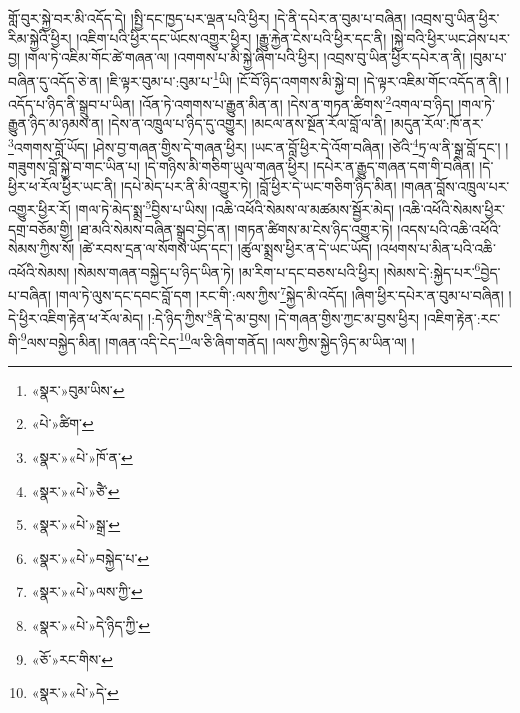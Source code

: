 གློ་བུར་སྐྱེ་བར་མི་འདོད་དེ། །སྤྱི་དང་ཁྱད་པར་ལྡན་པའི་ཕྱིར། །དེ་ནི་དཔེར་ན་བུམ་པ་བཞིན། །འབྲས་བུ་ཡིན་ཕྱིར་རིམ་སྐྱེའི་ཕྱིར། །འཇིག་པའི་ཕྱིར་དང་ཡོངས་འགྱུར་ཕྱིར། །རྒྱུ་རྐྱེན་ངེས་པའི་ཕྱིར་དང་ནི། །སྐྱེ་བའི་ཕྱིར་ཡང་ཤེས་པར་བྱ། །གལ་ཏེ་འཇིམ་གོང་ཚེ་གཞན་ལ། །འགགས་པ་མི་སྐྱེ་ཞིག་པའི་ཕྱིར། །འབྲས་བུ་ཡིན་ཕྱིར་དཔེར་ན་ནི། །བུམ་པ་བཞིན་དུ་འདོད་ཅེ་ན། །ཇི་ལྟར་བུམ་པ་:བུམ་པ་\footnote{«སྣར་»བུམ་ཡིས་}ཡི། །ངོ་བོ་ཉིད་འགགས་མི་སྐྱེ་བ། །དེ་ལྟར་འཇིམ་གོང་འདོད་ན་ནི། །འདོད་པ་ཉིད་ནི་སྒྲུབ་པ་ཡིན། །འོན་ཏེ་འགགས་པ་རྒྱུན་མིན་ན། །དེས་ན་གཏན་ཚིགས་\footnote{«པེ་»ཚིག་}འགལ་བ་ཉིད། །གལ་ཏེ་རྒྱུན་ཉིད་མ་ཉམས་ན། །དེས་ན་འཁྲུལ་པ་ཉིད་དུ་འགྱུར། །མངལ་ནས་སྔོན་རོལ་བློ་ལ་ནི། །མདུན་རོལ་:ཁོ་ནར་\footnote{«སྣར་»«པེ་»ཁོ་ན་}འགགས་བློ་ཡོད། །ཤེས་བྱ་གཞན་གྱིས་དེ་གཞན་ཕྱིར། །ཡང་ན་བློ་ཕྱིར་དེ་འོག་བཞིན། །ཙེའི་\footnote{«སྣར་»«པེ་»ཙཻ་}ཏྲ་ལ་ནི་སྒྲ་བློ་དང་། །གཟུགས་བློ་སྐྱེ་བ་གང་ཡིན་པ། །དེ་གཉིས་མི་གཅིག་ཡུལ་གཞན་ཕྱིར། །དཔེར་ན་རྒྱུད་གཞན་དག་གི་བཞིན། །དེ་ཕྱིར་ཕ་རོལ་ཕྱིར་ཡང་ནི། །དཔེ་མེད་པར་ནི་མི་འགྱུར་ཏེ། །བློ་ཕྱིར་དེ་ཡང་གཅིག་ཉིད་མིན། །གཞན་བློས་འཁྲུལ་པར་འགྱུར་ཕྱིར་རོ། །གལ་ཏེ་མེད་སྨྲ་\footnote{«སྣར་»«པེ་»སྒྲ་}བྱིས་པ་ཡིས། །འཆི་འཕོའི་སེམས་ལ་མཚམས་སྦྱོར་མེད། །འཆི་འཕོའི་སེམས་ཕྱིར་དགྲ་བཅོམ་གྱི། །ཐ་མའི་སེམས་བཞིན་སྒྲུབ་བྱེད་ན། །གཏན་ཚིགས་མ་ངེས་ཉིད་འགྱུར་ཏེ། །འདས་པའི་འཆི་འཕོའི་སེམས་ཀྱིས་སོ། །ཚེ་རབས་དྲན་ལ་སོགས་ཡོད་དང་། །ཚུལ་སྨྲས་ཕྱིར་ན་དེ་ཡང་ཡོད། །འཕགས་པ་མིན་པའི་འཆི་འཕོའི་སེམས། །སེམས་གཞན་བསྐྱེད་པ་ཉིད་ཡིན་ཏེ། །མ་རིག་པ་དང་བཅས་པའི་ཕྱིར། །སེམས་དེ་:སྐྱེད་པར་\footnote{«སྣར་»«པེ་»བསྐྱེད་པ་}བྱེད་པ་བཞིན། །གལ་ཏེ་ལུས་དང་དབང་བློ་དག །རང་གི་:ལས་ཀྱིས་\footnote{«སྣར་»«པེ་»ལས་ཀྱི་}སྐྱེད་མི་འདོད། །ཞིག་ཕྱིར་དཔེར་ན་བུམ་པ་བཞིན། །དེ་ཕྱིར་འཇིག་རྟེན་ཕ་རོལ་མེད། །:དེ་ཉིད་ཀྱིས་\footnote{«སྣར་»«པེ་»དེ་ཉིད་ཀྱི་}ནི་དེ་མ་བྱས། །དེ་གཞན་གྱིས་ཀྱང་མ་བྱས་ཕྱིར། །འཇིག་རྟེན་:རང་གི་\footnote{«ཅོ་»རང་གིས་}ལས་བསྐྱེད་མིན། །གཞན་འདི་ངེད་\footnote{«སྣར་»«པེ་»དེ་}ལ་ཅི་ཞིག་གནོད། །ལས་ཀྱིས་སྐྱེད་ཉིད་མ་ཡིན་ལ། །
